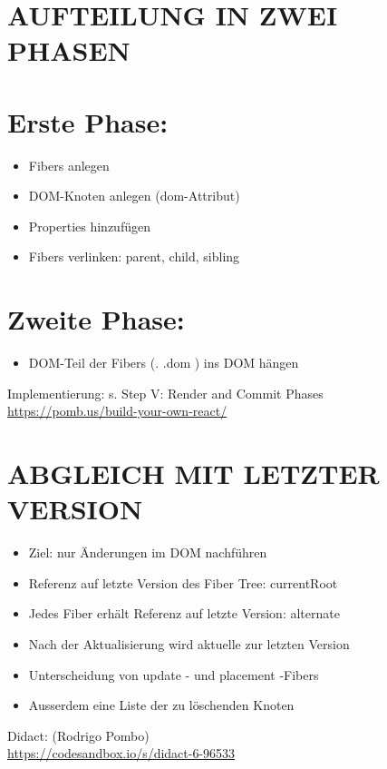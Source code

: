 \documentclass[10pt]{article}
\begin{document}
\section*{AUFTEILUNG IN ZWEI PHASEN}
\section*{Erste Phase:}
\begin{itemize}
  \item Fibers anlegen
  \item DOM-Knoten anlegen (dom-Attribut)
  \item Properties hinzufügen
  \item Fibers verlinken: parent, child, sibling
\end{itemize}

\section*{Zweite Phase:}
\begin{itemize}
  \item DOM-Teil der Fibers (. .dom ) ins DOM hängen
\end{itemize}

Implementierung: s. Step V: Render and Commit Phases\\
\href{https://pomb.us/build-your-own-react/}{https://pomb.us/build-your-own-react/}

\section*{ABGLEICH MIT LETZTER VERSION}
\begin{itemize}
  \item Ziel: nur Änderungen im DOM nachführen
  \item Referenz auf letzte Version des Fiber Tree: currentRoot
  \item Jedes Fiber erhält Referenz auf letzte Version: alternate
  \item Nach der Aktualisierung wird aktuelle zur letzten Version
  \item Unterscheidung von update - und placement -Fibers
  \item Ausserdem eine Liste der zu löschenden Knoten
\end{itemize}

Didact: (Rodrigo Pombo)\\
\href{https://codesandbox.io/s/didact-6-96533}{https://codesandbox.io/s/didact-6-96533}
\end{document}
